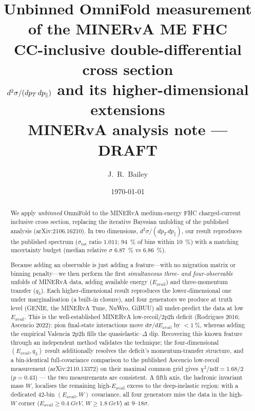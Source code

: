 \documentclass[11pt]{article}
\title{Unbinned OmniFold measurement of the MINERvA ME FHC\\
CC-inclusive double-differential cross section\\
$d^{2}\sigma/(d\pT\,d\pPar)$ and its higher-dimensional extensions\\[4pt]
\large MINERvA analysis note --- DRAFT}
\author{J.~R.~Bailey}
\date{\today}
\newcommand{\pT}{p_{T}}
\newcommand{\pPar}{p_{\parallel}}
\newcommand{\Eavail}{E_{\mathrm{avail}}}
\begin{document}
\maketitle

\begin{abstract}
We apply \emph{unbinned} OmniFold to the MINERvA medium-energy FHC
charged-current inclusive cross section, replacing the iterative Bayesian
unfolding of the published analysis (arXiv:2106.16210). In two dimensions,
$d^{2}\sigma/(d\pT\,d\pPar)$, our result reproduces the published spectrum
($\sigma_{\mathrm{tot}}$ ratio $1.011$; \SI{94}{\percent} of bins within
\SI{10}{\percent}) with a matching uncertainty budget (median relative $\sigma$
\SI{6.87}{\percent} vs \SI{6.86}{\percent}).

Because adding an observable is just adding a feature---with no migration matrix
or binning penalty---we then perform the first \emph{simultaneous three- and
four-observable} unfolds of MINERvA data, adding available energy ($\Eavail$)
and three-momentum transfer ($q_{3}$). Each higher-dimensional result reproduces
the lower-dimensional one under marginalisation (a built-in closure), and four
generators we produce at truth level (GENIE, the MINERvA Tune, NuWro, GiBUU) all
under-predict the data at low $\Eavail$. This is the well-established MINERvA
low-recoil/2p2h deficit (Rodrigues 2016; Ascencio 2022): pion final-state
interactions move $d\sigma/d\Eavail$ by $<\SI{1}{\percent}$, whereas adding the
empirical Valencia 2p2h fills the quasielastic--$\Delta$ dip. Recovering this
known feature through an independent method validates the technique; the
four-dimensional $(\Eavail,q_{3})$ result additionally resolves the deficit's
momentum-transfer structure, and a bin-identical full-covariance comparison to
the published Ascencio low-recoil measurement (arXiv:2110.13372) on their
maximal common grid gives $\chi^{2}/\mathrm{ndf}=1.68/2$ ($p=0.43$) --- the
two measurements are consistent. A fifth axis, the hadronic
invariant mass $W$, localises the remaining high-$\Eavail$ excess to the
deep-inelastic region: with a dedicated 42-bin $(\Eavail,W)$ covariance, all
four generators miss the data in the high-$W$ corner
($\Eavail\ge\SI{0.4}{GeV}$, $W\ge\SI{1.8}{GeV}$) at $9$--$18\sigma$.


\end{abstract}
\end{document}
